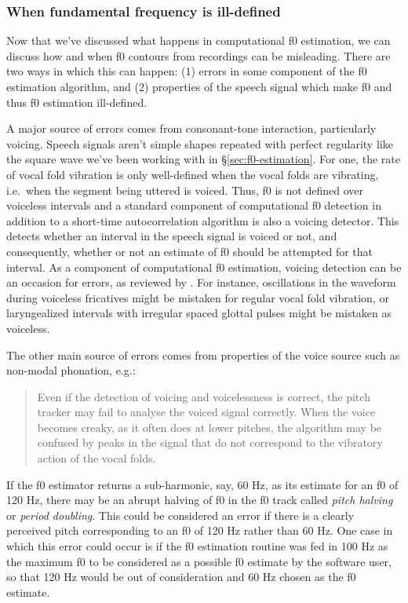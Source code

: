\documentclass[12pt]{article}
\begin{document}
\subsubsection{When fundamental frequency is ill-defined}
\label{sec:f0-ill}

Now that we've discussed what happens in computational f0 estimation,
we can discuss how and when f0 contours from recordings can be
misleading. There are two ways in which this can happen: (1) errors in
some component of the f0 estimation algorithm, and (2) properties of
the speech signal which make f0 and thus f0 estimation
ill-defined. 

A major source of errors comes from consonant-tone interaction,
particularly voicing.  
Speech signals aren't simple shapes repeated with perfect regularity like the
square wave we've been working with in \S\ref{sec:f0-estimation}. For
one, the rate of vocal fold vibration is only well-defined when the
vocal folds are vibrating, i.e.\ when the segment being uttered is
voiced. Thus, f0 is not defined over voiceless intervals and a
standard component of computational f0 detection in addition to a
short-time autocorrelation algorithm is also a voicing detector. This
detects whether an interval in the speech signal is voiced or not, and
consequently, whether or not an estimate of f0 should be attempted for
that interval. As a component of computational f0 estimation, voicing detection can be an occasion for errors, as reviewed by \citet[p.\ 6]{Gussenhoven:2004}. For
instance, oscillations in the waveform during voiceless fricatives
might be mistaken for regular vocal fold vibration, or laryngealized
intervals with irregular spaced glottal pulses might be mistaken as voiceless.    

The other main source of errors comes from properties of the voice
source such as non-modal phonation, e.g.:

\begin{quote}
\textsf{\small{Even if the detection of voicing and voicelessness is correct, the
pitch tracker may fail to analyse the voiced signal correctly. When
the voice becomes creaky, as it often does at lower pitches, the
algorithm may be confused by peaks in the signal that do not
correspond to the vibratory action of the vocal folds.
\citep[p.\ 6]{Gussenhoven:2004}}}
\end{quote}

If the f0 estimator returns a sub-harmonic, say, 60 Hz, as its
estimate for an f0 of 120 Hz, there may be an abrupt halving of f0 in
the f0 track called \textit{pitch halving} or \textit{period
  doubling}. This could be considered an error if there is a clearly perceived
pitch corresponding to an f0 of 120 Hz rather than 60 Hz. One case in
which this error could occur is if the f0 estimation routine was fed
in 100 Hz as the maximum f0 to be considered as a possible f0 estimate
by the software user, so that 120 Hz would be out of consideration and
60 Hz chosen as the f0 estimate. 
\end{document}
